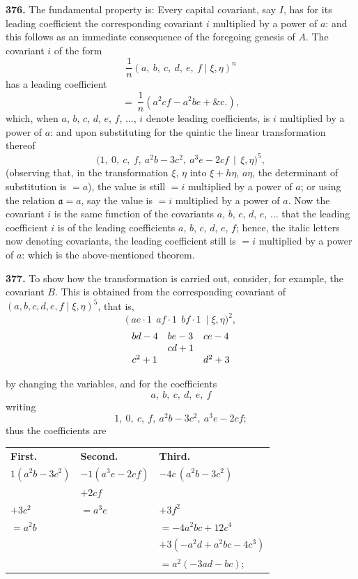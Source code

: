 \documentclass[11pt]{article}
\begin{document}
\noindent\textbf{376.} The fundamental property is: Every capital covariant, say $I$, has for its leading coefficient the corresponding covariant $i$ multiplied by a power of $a$: and this follows as an immediate consequence of the foregoing genesis of $A$. The covariant $i$ of the form
\[
\frac{1}{n}(a,\ b,\ c,\ d,\ e,\ f \mid \xi,\eta)^{n}
\]
has a leading coefficient
\[
=\ \frac{1}{n}(a^{2}cf-a^{2}be+\&\text{c.}),
\]
which, when $a$, $b$, $c$, $d$, $e$, $f$, $\ldots$, $i$ denote leading coefficients, is $i$ multiplied by a power of $a$: and upon substituting for the quintic the linear transformation thereof
\[
\bigl(1,\ 0,\ c,\ f,\ a^{2}b-3c^{2},\ a^{3}e-2cf\,\mid\,\xi,\eta\bigr)^{5},
\]
(observing that, in the transformation $\xi$, $\eta$ into $\xi+h\eta$, $a\eta$, the determinant of substitution is $=a$), the value is still $=i$ multiplied by a power of $a$; or using the relation $\mathfrak{a}=a$, say the value is $=i$ multiplied by a power of $a$. Now the covariant $i$ is the same function of the covariants $a$, $b$, $c$, $d$, $e$, $\ldots$ that the leading coefficient $i$ is of the leading coefficients $a$, $b$, $c$, $d$, $e$, $f$; hence, the italic letters now denoting covariants, the leading coefficient still is $=i$ multiplied by a power of $a$: which is the above-mentioned theorem.

\medskip

\noindent\textbf{377.} To show how the transformation is carried out, consider, for example, the covariant $B$. This is obtained from the corresponding covariant of $(a,b,c,d,e,f \mid \xi,\eta)^{5}$, that is,
\[
\bigl(\ ae\cdot 1\ \ af\cdot 1\ \ bf\cdot 1\ \mid \xi,\eta\bigr)^{2},
\]
\[
\begin{array}{l@{\quad}l@{\quad}l}
bd-4 & be-3 & ce-4 \\
 & cd+1 & \\
c^{2}+1 & & d^{2}+3
\end{array}
\]

by changing the variables, and for the coefficients
\[
a,\ b,\ c,\ d,\ e,\ f
\]
writing
\[
1,\ 0,\ c,\ f,\ a^{2}b-3c^{2},\ a^{3}e-2cf;
\]
thus the coefficients are

\medskip

\noindent\begin{tabular}{lll}
\textbf{First.} & \textbf{Second.} & \textbf{Third.} \\[2pt]
$1(a^{2}b-3c^{2})$ & $-1(a^{3}e-2cf)$ & $-4c\,(a^{2}b-3c^{2})$ \\
 & $+2cf$ & \\
$+3c^{2}$ & $=a^{3}e$ & $+3f^{2}$ \\
$=a^{2}b$ & & $=-4a^{2}bc+12c^{4}$ \\
 & & $+3(-a^{2}d+a^{2}bc-4c^{3})$ \\
 & & $=a^{2}(-3ad-bc)$;
\end{tabular}
\end{document}
